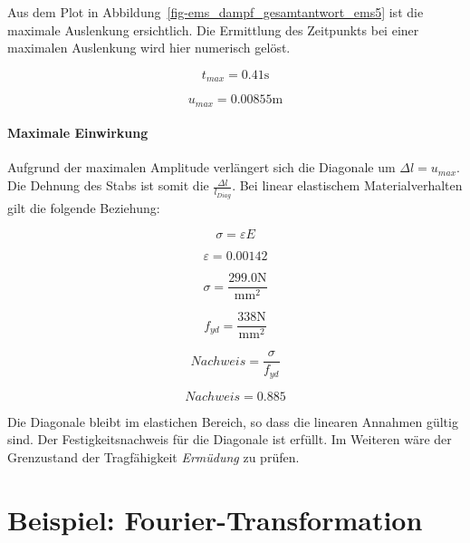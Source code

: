 \documentclass[
  letterpaper,
  DIV=11]{scrreprt}
\begin{document}
Aus dem Plot in Abbildung~\ref{fig-ems_dampf_gesamtantwort_ems5} ist die
maximale Auslenkung ersichtlich. Die Ermittlung des Zeitpunkts bei einer
maximalen Auslenkung wird hier numerisch gelöst.

\begin{equation}t_{max} = 0.41 \text{s}\end{equation}

\begin{equation}u_{max} = 0.00855 \text{m}\end{equation}

\hypertarget{maximale-einwirkung-1}{%
\subsubsection{Maximale Einwirkung}\label{maximale-einwirkung-1}}

Aufgrund der maximalen Amplitude verlängert sich die Diagonale um
\(\Delta l=u_{max}\). Die Dehnung des Stabs ist somit die
\(\frac{\Delta l}{l_{Diag}}\). Bei linear elastischem Materialverhalten
gilt die folgende Beziehung:

\[\sigma = \varepsilon E\]

\begin{equation}\varepsilon = 0.00142\end{equation}

\begin{equation}\sigma = \frac{299.0 \text{N}}{\text{mm}^{2}}\end{equation}

\begin{equation}f_{yd} = \frac{338 \text{N}}{\text{mm}^{2}}\end{equation}

\begin{equation}Nachweis = \frac{\sigma}{f_{yd}}\end{equation}

\begin{equation}Nachweis = 0.885\end{equation}

Die Diagonale bleibt im elastichen Bereich, so dass die linearen
Annahmen gültig sind. Der Festigkeitsnachweis für die Diagonale ist
erfüllt. Im Weiteren wäre der Grenzustand der Tragfähigkeit
\emph{Ermüdung} zu prüfen.

\hypertarget{beispiel-fourier-transformation}{%
\chapter{Beispiel:
Fourier-Transformation}\label{beispiel-fourier-transformation}}
\end{document}
